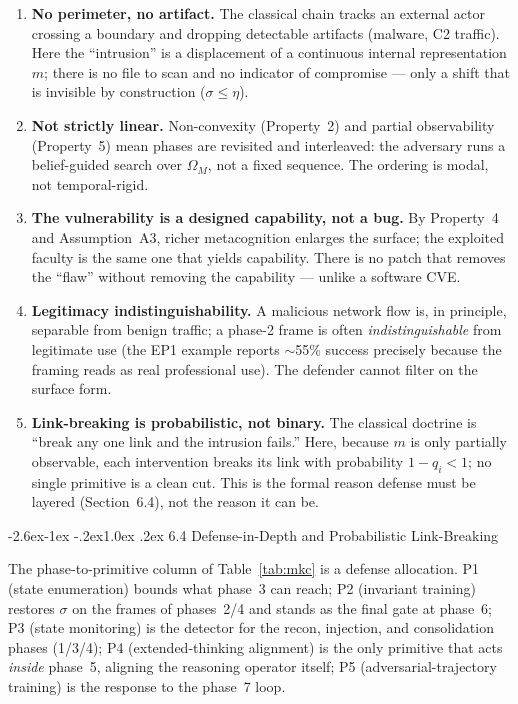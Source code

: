 \documentclass[
  11pt,
]{article}
\makeatletter
\renewcommand\subsection{\@startsection{subsection}{2}{\z@}%
  {-2.6ex\@plus -1ex \@minus -.2ex}{1.0ex \@plus .2ex}%
  {\normalfont\sffamily\large\bfseries}}
\makeatother
\begin{document}
\begin{enumerate}
\def\labelenumi{\arabic{enumi}.}
\item
  \textbf{No perimeter, no artifact.} The classical chain tracks an
  external actor crossing a boundary and dropping detectable artifacts
  (malware, C2 traffic). Here the ``intrusion'' is a displacement of a
  continuous internal representation \(m\); there is no file to scan and
  no indicator of compromise --- only a shift that is invisible by
  construction (\(\sigma\le\eta\)).
\item
  \textbf{Not strictly linear.} Non-convexity (Property~2) and partial
  observability (Property~5) mean phases are revisited and interleaved:
  the adversary runs a belief-guided search over \(\Omega_M\), not a
  fixed sequence. The ordering is modal, not temporal-rigid.
\item
  \textbf{The vulnerability is a designed capability, not a bug.} By
  Property~4 and Assumption~A3, richer metacognition enlarges the
  surface; the exploited faculty is the same one that yields
  capability. There is no patch that removes the ``flaw'' without
  removing the capability --- unlike a software CVE.
\item
  \textbf{Legitimacy indistinguishability.} A malicious network flow is,
  in principle, separable from benign traffic; a phase-2 frame is often
  \emph{indistinguishable} from legitimate use (the EP1 example reports
  \(\sim\)55\% success precisely because the framing reads as real
  professional use). The defender cannot filter on the surface form.
\item
  \textbf{Link-breaking is probabilistic, not binary.} The classical
  doctrine is ``break any one link and the intrusion fails.'' Here,
  because \(m\) is only partially observable, each intervention breaks
  its link with probability \(1-q_i<1\); no single primitive is a clean
  cut. This is the formal reason defense must be layered (Section~6.4),
  not the reason it can be.
\end{enumerate}

\subsection{6.4 Defense-in-Depth and Probabilistic
Link-Breaking}\label{mkc-defense-in-depth}

The phase-to-primitive column of Table~\ref{tab:mkc} is a defense allocation. P1
(state enumeration) bounds what phase~3 can reach; P2 (invariant
training) restores \(\sigma\) on the frames of phases~2/4 and stands as
the final gate at phase~6; P3 (state monitoring) is the detector for the
recon, injection, and consolidation phases (1/3/4); P4 (extended-thinking
alignment) is the only primitive that acts \emph{inside} phase~5,
aligning the reasoning operator itself; P5 (adversarial-trajectory
training) is the response to the phase~7 loop.
\end{document}
